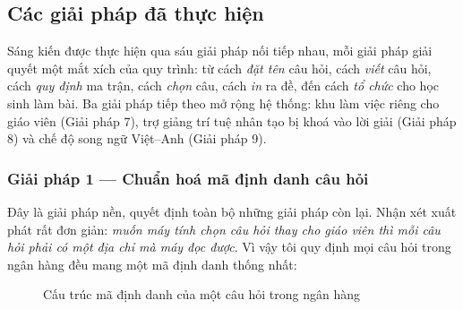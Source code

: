 \subsection{Các giải pháp đã thực hiện}

Sáng kiến được thực hiện qua sáu giải pháp nối tiếp nhau, mỗi giải pháp giải
quyết một mắt xích của quy trình: từ cách \textit{đặt tên} câu hỏi, cách
\textit{viết} câu hỏi, cách \textit{quy định} ma trận, cách \textit{chọn} câu,
cách \textit{in} ra đề, đến cách \textit{tổ chức} cho học sinh làm bài.
Ba giải pháp tiếp theo mở rộng hệ thống: khu làm việc riêng cho giáo viên
(Giải pháp 7), trợ giảng trí tuệ nhân tạo bị khoá vào lời giải (Giải pháp 8) và
chế độ song ngữ Việt--Anh (Giải pháp 9).

\subsubsection{Giải pháp 1 --- Chuẩn hoá mã định danh câu hỏi}

Đây là giải pháp nền, quyết định toàn bộ những giải pháp còn lại. Nhận xét
xuất phát rất đơn giản: \textit{muốn máy tính chọn câu hỏi thay cho giáo viên
thì mỗi câu hỏi phải có một địa chỉ mà máy đọc được}. Vì vậy tôi quy định mọi
câu hỏi trong ngân hàng đều mang một mã định danh thống nhất:

\begin{figure}[H]
\centering
{}
\caption{Cấu trúc mã định danh của một câu hỏi trong ngân hàng}
\end{figure}

